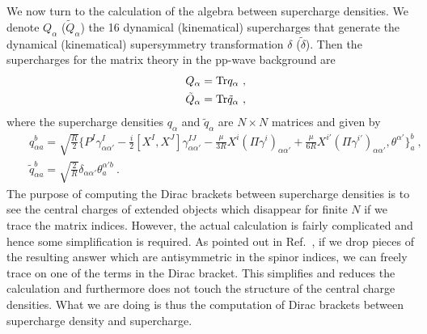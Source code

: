 \documentclass[a4paper,12pt]{article}
\begin{document}
We now turn to the calculation of the algebra between supercharge
densities.  We denote $Q_\alpha$ ($\tilde{Q}_\alpha$) the 16 dynamical
(kinematical) supercharges that generate the dynamical (kinematical)
supersymmetry transformation $\delta$ ($\tilde{\delta}$). Then the
supercharges for the matrix theory in the pp-wave background are
\begin{eqnarray}
 & & Q_\alpha = {\rm Tr} q_\alpha~, \nonumber \\
 & & \tilde{Q}_\alpha = {\rm Tr} \tilde{q}_\alpha~,
\end{eqnarray}
where the supercharge densities $q_\alpha$ and $\tilde{q}_\alpha$
are $N\times N$ matrices and given by
\begin{eqnarray}
& & q_{\alpha a}^b = \sqrt{\frac{R}{2}} \bigg\{ P^I
\gamma^I_{\alpha \alpha'} - \frac{i}{2} [ X^I, X^J]
\gamma^{IJ}_{\alpha \alpha'} - \frac{\mu}{3R} X^i (\Pi
\gamma^i)_{\alpha \alpha'} + \frac{\mu}{6R} X^{i'} (\Pi
\gamma^{i'})_{\alpha \alpha'}, \theta^{\alpha'} \bigg\}^b_a~,
                                        \nonumber \\
& & \tilde{q}_{\alpha a}^b = \sqrt{\frac{2}{R}} \delta_{\alpha
\alpha'} \theta^{\alpha' b}_a~.
\end{eqnarray}
The purpose of computing the Dirac brackets between supercharge
densities is to see the central charges of extended objects which
disappear for finite $N$ if we trace the matrix indices.  However, the
actual calculation is fairly complicated and hence some simplification
is required.  As pointed out in Ref.~\cite{ban157}, if we drop pieces
of the resulting answer which are antisymmetric in the spinor indices,
we can freely trace on one of the terms in the Dirac bracket.  This
simplifies and reduces the calculation and furthermore does not touch
the structure of the central charge densities. What we are doing is
thus the computation of Dirac brackets between supercharge density and
supercharge.
\end{document}

